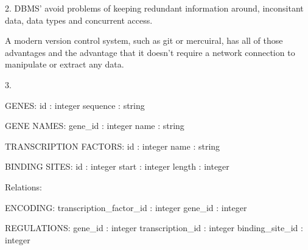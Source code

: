 
2.
DBMS' avoid problems of keeping redundant information around, inconsitant data,
data types and concurrent access.

A modern version control system, such as git or mercuiral, has all of those 
advantages and the advantage that it doesn't require a network connection to 
manipulate or extract any data.

3.

GENES:
	id : integer
	sequence : string

GENE NAMES:
	gene_id : integer
	name : string

TRANSCRIPTION FACTORS:
	id : integer
	name : string

BINDING SITES:
	id     : integer
	start  : integer
	length : integer

Relations:

ENCODING:
	transcription_factor_id : integer
	gene_id                 : integer

REGULATIONS:
	gene_id          : integer
	transcription_id : integer
	binding_site_id  : integer

